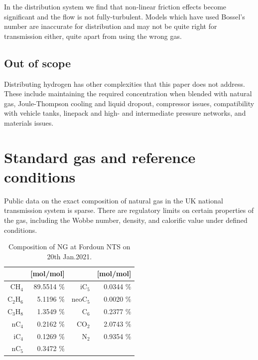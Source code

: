 \documentclass[5p]{elsarticle} %
\begin{document}
In the distribution system we find that non-linear friction effects become significant and the flow is not fully-turbulent. Models which have used Bossel's number are  inaccurate for distribution and may not be quite right for transmission either, quite apart from using the wrong gas.

\subsection{Out of scope}

Distributing hydrogen has other complexities that this paper does not address. 
These include 
maintaining the required concentration when blended with natural gas\citep{H2Blends21}, 
Joule-Thompson cooling and liquid dropout\citep{Schouten2004}, 
compressor issues\citep{Wit2018}, 
compatibility with vehicle tanks\citep{Altfeld2013}, 
linepack and high- and intermediate pressure networks\citep{Witek2022}, 
and
materials issues\citep{ARUP2023}.

\section{Standard gas and reference conditions}
\label{sec:standards}

Public data on the exact composition of natural gas in the UK national transmission system is sparse.
There are regulatory limits on certain properties of the gas, including the Wobbe  
number, density, and calorific value under defined conditions.

\begin{table}[htb]
    \centering
    \begin{tabular}{r|r|r|r}
        & [mol/mol]  && [mol/mol]\\
        \hline
        CH$_4$    & 89.5514  \% & iC$_5$    &  0.0344 \%\\
        C$_2$H$_6$   &  5.1196  \% & neoC$_5$  &  0.0020 \%\\
        C$_3$H$_8$   &  1.3549  \% & C$_6$     &  0.2377 \%\\
        nC$_4$    &  0.2162  \% & CO$_2$    &  2.0743 \%\\
        iC$_4$    &  0.1269  \% &N$_2$     &  0.9354 \%\\
        nC$_5$    &  0.3472  \% &   &  \\
         \hline
    \end{tabular}
    \caption{Composition of NG at Fordoun NTS on 20th Jan.2021.\citep{cngservices2019}}
    \label{tab:Fordoun}
\end{table}
\end{document}
